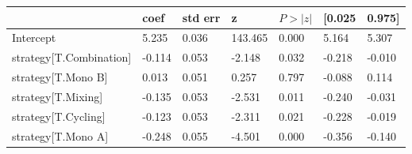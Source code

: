 \begin{tabular}{lllllll}
\toprule
 & coef & std err & z & $P>|z|$ & [0.025 & 0.975] \\
\midrule
Intercept & 5.235 & 0.036 &   143.465 &  0.000 & 5.164 & 5.307 \\
strategy[T.Combination] & -0.114 & 0.053 &    -2.148 &  0.032 & -0.218 & -0.010 \\
strategy[T.Mono B] & 0.013 & 0.051 &     0.257 &  0.797 & -0.088 & 0.114 \\
strategy[T.Mixing] & -0.135 & 0.053 &    -2.531 &  0.011 & -0.240 & -0.031 \\
strategy[T.Cycling] & -0.123 & 0.053 &    -2.311 &  0.021 & -0.228 & -0.019 \\
strategy[T.Mono A] & -0.248 & 0.055 &    -4.501 &  0.000 & -0.356 & -0.140 \\
\bottomrule
\end{tabular}
